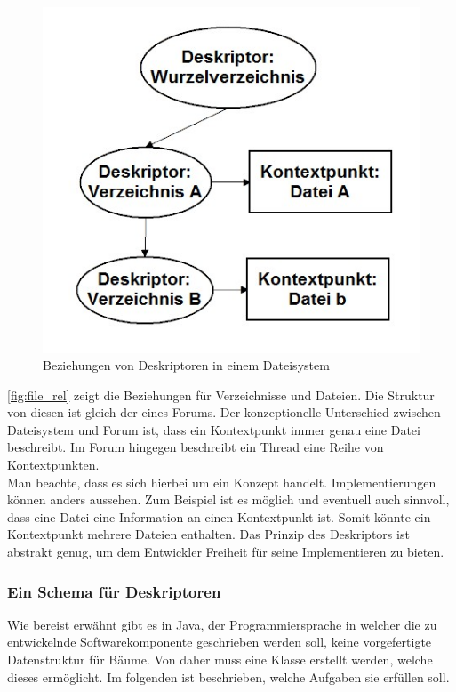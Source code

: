 \documentclass[a4paper]{article}
\begin{document}
	\begin{figure}[H]
		\centerline{
			\includegraphics[scale=0.8]{../Bilder/file_rel.jpg}
		}
		\caption{Beziehungen von Deskriptoren in einem Dateisystem}
		\label{fig:file_rel}
	\end{figure}	
	
	\autoref{fig:file_rel} zeigt die Beziehungen für Verzeichnisse und Dateien.
	Die Struktur von diesen ist gleich der eines Forums. 
	Der konzeptionelle Unterschied zwischen Dateisystem und Forum ist, 
	dass ein Kontextpunkt immer genau eine Datei beschreibt. Im Forum hingegen
	beschreibt ein Thread eine Reihe von Kontextpunkten.\\
	
	Man beachte, dass es sich hierbei um ein Konzept handelt.
	Implementierungen können anders aussehen. Zum Beispiel ist es möglich und
	eventuell auch sinnvoll, dass eine Datei eine Information an einen Kontextpunkt
	ist. Somit könnte ein Kontextpunkt mehrere Dateien enthalten. Das Prinzip des
	Deskriptors ist abstrakt genug, um dem Entwickler Freiheit für seine
	Implementieren zu bieten.
	
	\subsubsection{Ein Schema für Deskriptoren}
	
	Wie bereist erwähnt gibt es in Java, der Programmiersprache in welcher die 
	zu entwickelnde Softwarekomponente geschrieben werden soll, keine vorgefertigte
	Datenstruktur für Bäume. Von daher muss eine Klasse erstellt werden, welche
	dieses ermöglicht. Im folgenden ist beschrieben, welche Aufgaben sie erfüllen
	soll.
	
\end{document}

